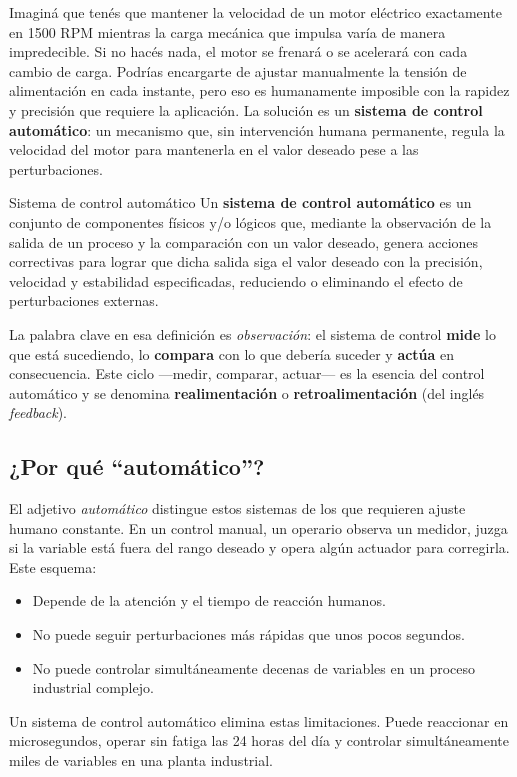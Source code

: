 Imaginá que tenés que mantener la velocidad de un motor eléctrico exactamente
en 1500 RPM mientras la carga mecánica que impulsa varía de manera impredecible.
Si no hacés nada, el motor se frenará o se acelerará con cada cambio de carga.
Podrías encargarte de ajustar manualmente la tensión de alimentación en cada
instante, pero eso es humanamente imposible con la rapidez y precisión que requiere
la aplicación. La solución es un \textbf{sistema de control automático}: un
mecanismo que, sin intervención humana permanente, regula la velocidad del motor
para mantenerla en el valor deseado pese a las perturbaciones.

\begin{definicion}{Sistema de control automático}
  Un \textbf{sistema de control automático} es un conjunto de componentes físicos
  y/o lógicos que, mediante la observación de la salida de un proceso y la
  comparación con un valor deseado, genera acciones correctivas para lograr que
  dicha salida siga el valor deseado con la precisión, velocidad y estabilidad
  especificadas, reduciendo o eliminando el efecto de perturbaciones externas.
\end{definicion}

La palabra clave en esa definición es \textit{observación}: el sistema de control
\textbf{mide} lo que está sucediendo, lo \textbf{compara} con lo que debería suceder
y \textbf{actúa} en consecuencia. Este ciclo ---medir, comparar, actuar--- es la
esencia del control automático y se denomina \textbf{realimentación} o
\textbf{retroalimentación} (del inglés \textit{feedback}).

\subsection{¿Por qué ``automático''?}

El adjetivo \textit{automático} distingue estos sistemas de los que requieren
ajuste humano constante. En un control manual, un operario observa un medidor,
juzga si la variable está fuera del rango deseado y opera algún actuador para
corregirla. Este esquema:
\begin{itemize}
  \item Depende de la atención y el tiempo de reacción humanos.
  \item No puede seguir perturbaciones más rápidas que unos pocos segundos.
  \item No puede controlar simultáneamente decenas de variables en un proceso
        industrial complejo.
\end{itemize}
Un sistema de control automático elimina estas limitaciones. Puede reaccionar
en microsegundos, operar sin fatiga las 24 horas del día y controlar
simultáneamente miles de variables en una planta industrial.

